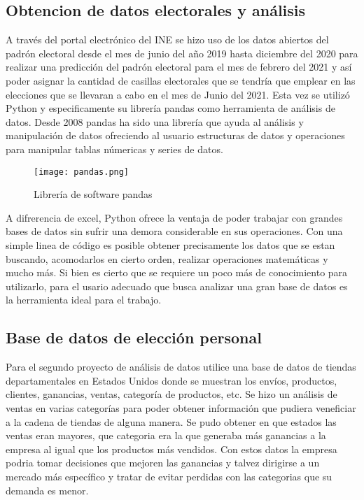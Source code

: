 \documentclass[%
 reprint,
 amsmath,amssymb,
 aps,
]{revtex4-2}
\begin{document}
\subsection{Obtencion de datos electorales y análisis }
A través del portal electrónico del INE se hizo uso de los datos abiertos del padrón electoral desde el mes de junio del año 2019 hasta diciembre del 2020 para realizar una predicción del padrón electoral para el mes de febrero del 2021 y así poder asignar la cantidad de casillas electorales que se tendría que emplear en las elecciones que se llevaran a cabo en el mes de Junio del 2021.
Esta vez se utilizó Python y especificamente su librería pandas como herramienta de análisis de datos. Desde 2008 pandas ha sido una librería que ayuda al análisis y manipulación de datos ofreciendo al usuario  estructuras de datos y operaciones  para manipular tablas númericas  y series de datos.

\begin{figure}[h]
    \centering
    \texttt{[image: pandas.png]}
    \caption{Librería de software pandas}
    \label{fig:my_label}
\end{figure}
 A difrerencia de excel, Python ofrece la ventaja de poder trabajar con grandes bases de datos sin sufrir una demora considerable en sus operaciones. Con una simple linea de código es posible obtener precisamente los datos que se estan buscando, acomodarlos en cierto orden, realizar operaciones matemáticas y mucho más. Si bien es cierto que se requiere un poco más de conocimiento para utilizarlo, para el usario adecuado que busca analizar una gran base de datos es la herramienta ideal para el trabajo.
 
\subsection{Base de datos de elección personal}
Para el segundo proyecto de análisis de datos utilice una base de datos de tiendas departamentales en Estados Unidos donde se muestran los envíos, productos, clientes, ganancias, ventas, categoría de productos, etc.
Se hizo un análisis de ventas en varias categorías para poder obtener información que pudiera veneficiar a la cadena de tiendas de alguna manera. 
Se pudo obtener en que estados las ventas eran mayores, que categoria era la que generaba más ganancias a la empresa al igual que los productos más vendidos. 
Con estos datos la empresa podria tomar decisiones que mejoren las ganancias y talvez dirigirse a un mercado más específico y tratar de evitar perdidas con las categorias que su demanda es menor.
\end{document}
